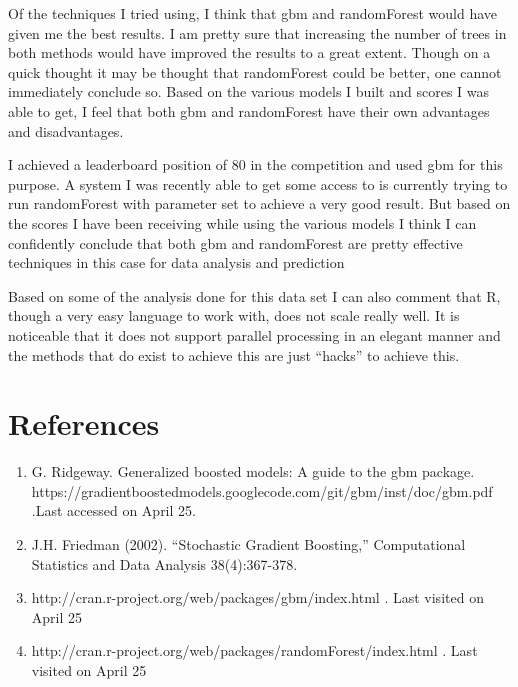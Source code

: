 \documentclass[paper=a4, fontsize=11pt]{scrartcl}	%
\numberwithin{equation}{section}		%
\numberwithin{figure}{section}			%
\numberwithin{table}{section}				%
\begin{document}
Of the techniques I tried using, I think that gbm and randomForest would have given me the best results. I am pretty sure that increasing the number of trees in both methods would have improved the results to a great extent. Though on a quick thought it may be thought that randomForest could be better, one cannot immediately conclude so. Based on the various models I built and scores I was able to get, I feel that both gbm and randomForest have their own advantages and disadvantages.

I achieved a leaderboard position of 80 in the competition and used gbm for this purpose. A system I was recently able to get some access to is currently trying to run randomForest with parameter set to achieve a very good result. But based on the scores I have been receiving while using the various models I think I can confidently conclude that both gbm and randomForest are pretty effective techniques in this case for data analysis and prediction

Based on some of the analysis done for this data set I can also comment that R, though a very easy language to work with, does not scale really well. It is noticeable that it does not support parallel processing in an elegant manner and the methods that do exist to achieve this are just ``hacks'' to achieve this.

\section{References}

\begin{enumerate}
\item
G. Ridgeway. Generalized boosted models: A guide to the gbm package. \\ 
https://gradientboostedmodels.googlecode.com/git/gbm/inst/doc/gbm.pdf .Last accessed on April 25.

\item
J.H. Friedman (2002). “Stochastic Gradient Boosting,” Computational Statistics and Data Analysis 38(4):367-378.

\item
http://cran.r-project.org/web/packages/gbm/index.html . Last visited on April 25

\item
http://cran.r-project.org/web/packages/randomForest/index.html . Last visited on April 25
\end{enumerate}

\end{document}
